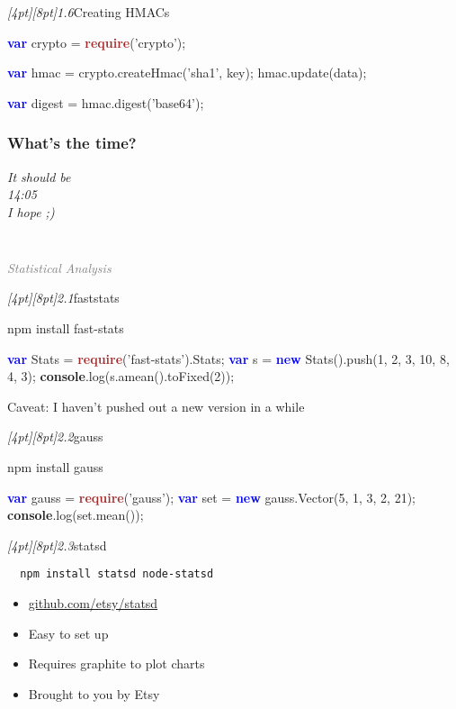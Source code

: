 \documentclass{beamer}
\newcommand{\sn}[1]{\textrm{\textit{\Huge{\raisebox{-3pt}[4pt][8pt]{\textcolor{f2elblue}{#1}}}}}\hspace{4pt}}
\newcommand{\innersplash}[1]{
  \begin{center}
    \large \textrm{\textit{ #1 } }
  \end{center}
}
\newcommand{\splashslide}[2][{}]{
  \begin{frame}
  \frametitle{#1}
  \innersplash{#2}
  \end{frame}
}
\newcommand{\leadinslide}[2]{
  \splashslide{
     {\fontsize{150}{20}\selectfont{\raisebox{0pt}[90pt][0pt]{\textcolor{light-gray}{#1}}}} \\ \huge \textcolor{gray}{#2}
  }
}
\def\brown<#1>#2{\textcolor<#1>{brown}{\textbf<#1>{#2}}}
\def\green<#1>#2{\textcolor<#1>{dark-green}{\textbf<#1>{#2}}}
\def\blue<#1>#2{\textcolor<#1>{blue}{\textbf<#1>{#2}}}
\begin{document}
\begin{frame}[fragile]{\sn{1.6}Creating HMACs}
\begin{semiverbatim}
  \blue<1>{var} crypto = \brown<1>{require}('crypto');

  \blue<1>{var} hmac = crypto.createHmac('sha1', key);
  hmac.update(data);

  \blue<1>{var} digest = hmac.digest('base64');
\end{semiverbatim}
\end{frame}

\splashslide[What's the time?]{\LARGE It should be \\ 14:05 \\ \small I hope ;) }

\leadinslide{2}{Statistical Analysis}

\begin{frame}[fragile]{\sn{2.1}faststats}
\begin{semiverbatim}
  npm install fast-stats

  \blue<1>{var} Stats = \brown<1>{require}('fast-stats').Stats;
  \blue<1>{var} s = \blue<1>{new} Stats().push(1, 2, 3, 10, 8, 4, 3);
  \green<1>{console}.log(s.amean().toFixed(2));
\end{semiverbatim}
Caveat: I haven't pushed out a new version in a while
\end{frame}

\begin{frame}[fragile]{\sn{2.2}gauss}
\begin{semiverbatim}
  npm install gauss

  \blue<1>{var} gauss = \brown<1>{require}('gauss');
  \blue<1>{var} set = \blue<1>{new} gauss.Vector(5, 1, 3, 2, 21);
  \green<1>{console}.log(set.mean());
\end{semiverbatim}
\end{frame}


\begin{frame}[fragile]{\sn{2.3}statsd}
\begin{verbatim}
  npm install statsd node-statsd
\end{verbatim}
\begin{itemize}
  \item \href{https://github.com/etsy/statsd}{github.com/etsy/statsd}
  \item Easy to set up
  \item Requires graphite to plot charts
  \item Brought to you by Etsy
\end{itemize}
\end{frame}
\end{document}
